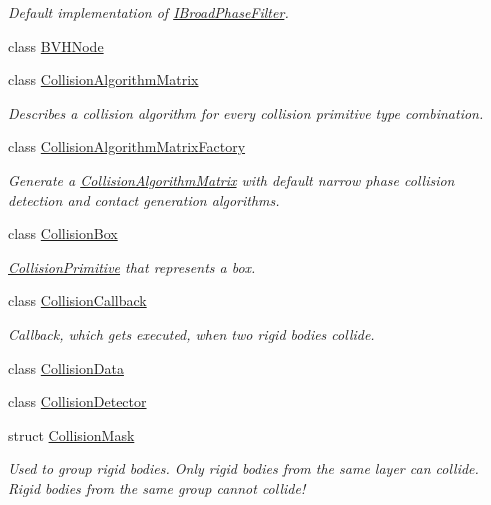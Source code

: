 \begin{DoxyCompactItemize}
\begin{DoxyCompactList}\small\item\em Default implementation of \mbox{\hyperlink{classr3_1_1_i_broad_phase_filter}{I\+Broad\+Phase\+Filter}}. \end{DoxyCompactList}\item 
class \mbox{\hyperlink{classr3_1_1_b_v_h_node}{B\+V\+H\+Node}}
\item 
class \mbox{\hyperlink{classr3_1_1_collision_algorithm_matrix}{Collision\+Algorithm\+Matrix}}
\begin{DoxyCompactList}\small\item\em Describes a collision algorithm for every collision primitive type combination. \end{DoxyCompactList}\item 
class \mbox{\hyperlink{classr3_1_1_collision_algorithm_matrix_factory}{Collision\+Algorithm\+Matrix\+Factory}}
\begin{DoxyCompactList}\small\item\em Generate a \mbox{\hyperlink{classr3_1_1_collision_algorithm_matrix}{Collision\+Algorithm\+Matrix}} with default narrow phase collision detection and contact generation algorithms. \end{DoxyCompactList}\item 
class \mbox{\hyperlink{classr3_1_1_collision_box}{Collision\+Box}}
\begin{DoxyCompactList}\small\item\em \mbox{\hyperlink{classr3_1_1_collision_primitive}{Collision\+Primitive}} that represents a box. \end{DoxyCompactList}\item 
class \mbox{\hyperlink{classr3_1_1_collision_callback}{Collision\+Callback}}
\begin{DoxyCompactList}\small\item\em Callback, which gets executed, when two rigid bodies collide. \end{DoxyCompactList}\item 
class \mbox{\hyperlink{classr3_1_1_collision_data}{Collision\+Data}}
\item 
class \mbox{\hyperlink{classr3_1_1_collision_detector}{Collision\+Detector}}
\item 
struct \mbox{\hyperlink{structr3_1_1_collision_mask}{Collision\+Mask}}
\begin{DoxyCompactList}\small\item\em Used to group rigid bodies. Only rigid bodies from the same layer can collide. Rigid bodies from the same group cannot collide! \end{DoxyCompactList}\item 

\end{DoxyCompactItemize}
